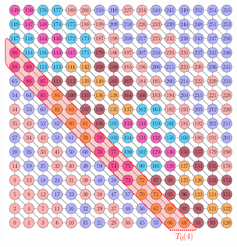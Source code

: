       \begin{figure}[t]
       	\begin{minipage}[c]{0.6\textwidth}
       		\includegraphics[height=0.3\textheight,width=0.89\textwidth]{pics/recursion/2d-7pt_example/2d-7pt/stencil_2d_7pt}
       	\end{minipage}\hfill
       	\begin{minipage}[c]{0.4\textwidth}

\end{minipage}
\end{figure}
